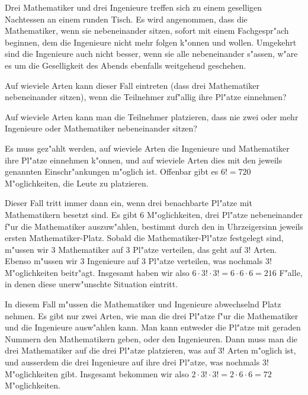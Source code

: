 Drei Mathematiker und drei Ingenieure treffen sich zu einem
geselligen Nachtessen an einem runden Tisch.
Es wird angenommen, dass die Mathematiker, wenn sie nebeneinander
sitzen, sofort mit einem Fachgespr"ach beginnen, dem
die Ingenieure nicht mehr folgen k"onnen und wollen. Umgekehrt
sind die Ingenieure auch nicht besser, wenn sie alle nebeneinander
s"assen, w"are es um die Geselligkeit des Abends ebenfalls weitgehend
geschehen.
\begin{teilaufgaben}
\item
Auf wieviele Arten kann dieser Fall eintreten (dass drei Mathematiker
nebeneinander sitzen),
wenn die Teilnehmer zuf"allig ihre Pl"atze einnehmen?
\item
Auf wieviele Arten kann man die Teilnehmer platzieren, dass nie zwei oder
mehr Ingenieure oder Mathematiker nebeneinander sitzen?
\end{teilaufgaben}

\begin{loesung}
Es muss gez"ahlt werden, auf wieviele Arten die Ingenieure und Mathematiker
ihre Pl"atze einnehmen k"onnen, und auf wieviele Arten dies mit den
jeweils genannten Einschr"ankungen m"oglich ist. Offenbar gibt es $6!=720$
M"oglichkeiten, die Leute zu platzieren.
\begin{teilaufgaben}
\item Dieser Fall tritt immer dann ein, wenn drei benachbarte Pl"atze
mit Mathematikern besetzt sind.
Es gibt 6 M"oglichkeiten, drei Pl"atze
nebeneinander f"ur die Mathematiker auszuw"ahlen, bestimmt durch den
in Uhrzeigersinn jeweils ersten Mathematiker-Platz.
Sobald die Mathematiker-Pl"atze festgelegt sind, m"ussen wir 3 Mathematiker
auf 3 Pl"atze verteilen, das geht auf $3!$ Arten. Ebenso m"ussen wir
3 Ingenieure auf 3 Pl"atze verteilen, was nochmals $3!$ M"oglichkeiten
beitr"agt. Insgesamt haben wir also $6\cdot 3!\cdot 3!=6\cdot 6\cdot 6=216$
F"alle, in denen diese unerw"unschte Situation eintritt.
\item In diesem Fall m"ussen die Mathematiker und Ingenieure abwechselnd
Platz nehmen. Es gibt nur zwei Arten, wie man die drei Pl"atze f"ur die
Mathematiker und die Ingenieure ausw"ahlen kann. Man kann entweder die
Pl"atze mit geraden Nummern den Mathematikern geben, oder den Ingenieuren.
Dann muss man die drei Mathematiker auf die drei Pl"atze platzieren,
was auf $3!$ Arten m"oglich ist, und ausserdem die drei Ingenieure auf
ihre drei Pl"atze, was nochmals $3!$ M"oglichkeiten gibt. Insgesamt bekommen
wir also $2\cdot 3!\cdot 3!=2\cdot 6\cdot 6=72$ M"oglichkeiten.
\end{teilaufgaben}
\end{loesung}
